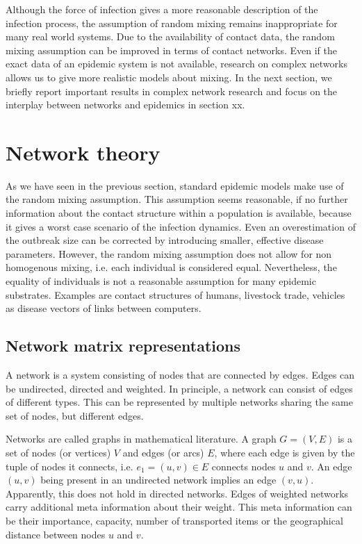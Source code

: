 \documentclass[openright,twoside,headsepline]{scrbook}
\begin{document}
Although the force of infection gives a more reasonable description of the infection process, the assumption of random mixing remains inappropriate for many real world systems.
Due to the availability of contact data, the random mixing assumption can be improved in terms of contact networks.
Even if the exact data of an epidemic system is not available, research on complex networks allows us to give more realistic models about mixing.
In the next section, we briefly report important results in complex network research and focus on the interplay between networks and epidemics in section xx.


\section{Network theory}
As we have seen in the previous section, standard epidemic models make use of the random mixing assumption.
This assumption seems reasonable, if no further information about the contact structure within a population is available, because it gives a worst case scenario of the infection dynamics.
Even an overestimation of the outbreak size can be corrected by introducing smaller, effective disease parameters.
However, the random mixing assumption does not allow for non homogenous mixing, i.e. each individual is considered equal.
Nevertheless, the equality of individuals is not a reasonable assumption for many epidemic substrates.
Examples are contact structures of humans, livestock trade, vehicles as disease vectors of links between computers.

\subsection{Network matrix representations}
A network is a system consisting of nodes that are connected by edges.
Edges can be undirected, directed and weighted.
In principle, a network can consist of edges of different types.
This can be represented by multiple networks sharing the same set of nodes, but different edges.

Networks are called graphs in mathematical literature.
A graph $G=(V,E)$ is a set of nodes (or vertices) $V$ and edges (or arcs) $E$, where each edge is given by the tuple of nodes it connects, i.e. $e_1 =(u,v) \in E$ connects nodes $u$ and $v$.
An edge $(u,v)$ being present in an undirected network implies an edge $(v,u)$.
Apparently, this does not hold in directed networks.
Edges of weighted networks carry additional meta information about their weight.
This meta information can be their importance, capacity, number of transported items or the geographical distance between nodes $u$ and $v$.
\end{document}
